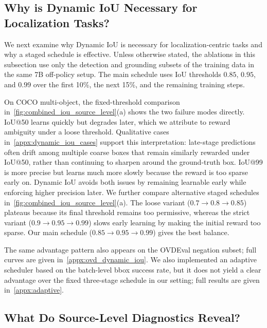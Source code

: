 \subsection{Why is Dynamic IoU Necessary for Localization Tasks?}
\label{subsec:dynamic_iou_ablation}

We next examine why Dynamic IoU is necessary for localization-centric tasks and why a staged schedule is effective.
%
Unless otherwise stated, the ablations in this subsection use only the detection and grounding subsets of the training data in the same 7B off-policy setup.
%
The main schedule uses IoU thresholds $0.85$, $0.95$, and $0.99$ over the first 10\%, the next 15\%, and the remaining training steps.

On COCO multi-object, the fixed-threshold comparison in~\cref{fig:combined_iou_source_level}(a) shows the two failure modes directly.
%
IoU@50 learns quickly but degrades later, which we attribute to reward ambiguity under a loose threshold.
%
Qualitative cases in~\cref{appx:dynamic_iou_cases} support this interpretation: late-stage predictions often drift among multiple coarse boxes that remain similarly rewarded under IoU@50, rather than continuing to sharpen around the ground-truth box.
%
IoU@99 is more precise but learns much more slowly because the reward is too sparse early on.
%
Dynamic IoU avoids both issues by remaining learnable early while enforcing higher precision later.
%
We further compare alternative staged schedules in~\cref{fig:combined_iou_source_level}(a).
%
The loose variant ($0.7 \rightarrow 0.8 \rightarrow 0.85$) plateaus because its final threshold remains too permissive, whereas the strict variant ($0.9 \rightarrow 0.95 \rightarrow 0.99$) slows early learning by making the initial reward too sparse.
%
Our main schedule ($0.85 \rightarrow 0.95 \rightarrow 0.99$) gives the best balance.

The same advantage pattern also appears on the OVDEval negation subset; full curves are given in~\cref{appx:ovd_dynamic_iou}.
%
We also implemented an adaptive scheduler based on the batch-level bbox success rate, but it does not yield a clear advantage over the fixed three-stage schedule in our setting; full results are given in~\cref{appx:adaptive}.


\subsection{What Do Source-Level Diagnostics Reveal?}
\label{subsec:source_level_diagnostics}

